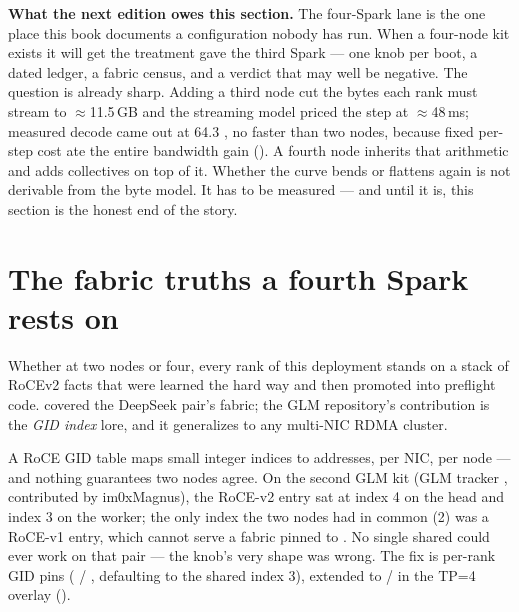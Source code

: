 \begin{hbnote}
\textbf{What the next edition owes this section.} The four-Spark lane is the
one place this book documents a configuration nobody has run. When a
four-node kit exists it will get the treatment  gave the
third Spark --- one knob per boot, a dated ledger, a fabric census, and a
verdict that may well be negative. The question is already sharp. Adding a
third node cut the bytes each rank must stream to $\approx$11.5\,GB and the
streaming model priced the step at $\approx$48\,ms; measured decode came
out at 64.3 \tokspersec{}, no faster than two nodes, because fixed per-step
cost ate the entire bandwidth gain (). A fourth node inherits
that arithmetic and adds collectives on top of it. Whether the curve bends
or flattens again is not derivable from the byte model. It has to be
measured --- and until it is, this section is the honest end of the story.
\end{hbnote}

\section{The fabric truths a fourth Spark rests on}

Whether at two nodes or four, every rank of this deployment stands on a
stack of RoCEv2 facts that were learned the hard way and then promoted into
preflight code.  covered the DeepSeek pair's fabric; the GLM
repository's contribution is the \emph{GID index} lore, and it generalizes to any
multi-NIC RDMA cluster.

A RoCE GID table maps small integer indices to addresses, per NIC, per
node --- and nothing guarantees two nodes agree. On the second GLM kit
(GLM tracker , contributed by im0xMagnus), the RoCE-v2
 entry sat at index 4 on the head and index 3 on the
worker; the only index the two nodes had in common (2) was a RoCE-v1 entry,
which cannot serve a fabric pinned to .
No single shared  could ever work on that pair
--- the knob's very shape was wrong. The fix is per-rank GID pins
( / , defaulting to the shared index 3),
extended to  /  in the TP=4 overlay
().

